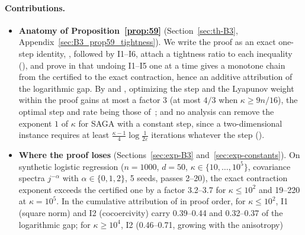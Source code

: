 \paragraph{Contributions.}
\begin{itemize}[leftmargin=1.4em,itemsep=1pt,topsep=2pt]
\item \textbf{Anatomy of Proposition~\ref{prop:59}} (Section~\ref{sec:th-B3}, Appendix~\ref{sec:B3_prop59_tightness}).
We write the proof as an exact one-step identity, , followed by I1--I6, attach a tightness
ratio to each inequality (), and prove in  that undoing I1--I5 one
at a time gives a monotone chain from the certified to the exact contraction, hence an additive attribution of the
logarithmic gap. By  and , optimizing the step and the Lyapunov
weight within the proof gains at most a factor $3$ (at most $4/3$ when $\kappa\ge9n/16$), the optimal step and rate
being those of~\cite{hofmann2015variance}; and no analysis can remove the exponent $1$ of $\kappa$ for SAGA with a
constant step, since a two-dimensional instance requires at least $\frac{\kappa-1}4\log\frac1{2\varepsilon}$
iterations whatever the step ().
\item \textbf{Where the proof loses} (Sections~\ref{sec:exp-B3} and~\ref{sec:exp-constants}). On synthetic logistic
regression ($n=1000$, $d=50$, $\kappa\in\{10,\dots,10^5\}$, covariance spectra $j^{-\alpha}$ with
$\alpha\in\{0,1,2\}$, 5 seeds, passes 2--20), the exact contraction exponent exceeds the certified one by a factor
3.2--3.7 for $\kappa\le10^2$ and 19--220 at $\kappa=10^5$. In the cumulative attribution of
 in proof order, for $\kappa\le10^2$, I1 (square norm) and I2 (cocoercivity) carry
0.39--0.44 and 0.32--0.37 of the logarithmic gap; for $\kappa\ge10^4$, I2 (0.46--0.71, growing with the anisotropy)

\end{itemize}
